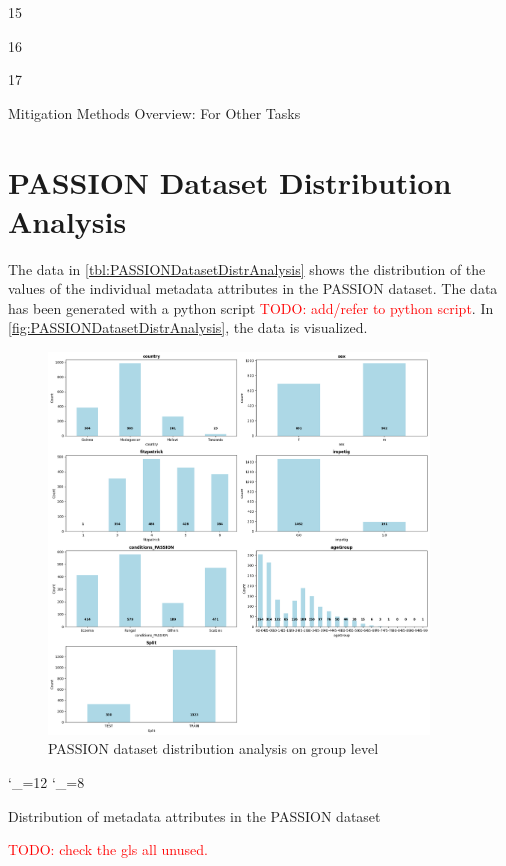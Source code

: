 \documentclass[12pt, a4paper, oneside]{book}   	%
\renewcommand{\todo}[1]{\textcolor{red}{TODO: #1}}
\begin{document}
\begin{appendices}
\begin{table}[H]
\begin{threeparttable}
\begin{tablenotes}
\begin{minipage}{0.33\textwidth}
							\item[15] \autocite{M5_}
							\item[16] \autocite{M90_}
							\item[17] \autocite{M65_}
						\end{minipage}%
					\end{tablenotes}
				\end{threeparttable}
				\caption{Mitigation Methods Overview: For Other  Tasks}
				\label{tab:mitigation_methods_others}
			\end{table}
			
			
			\chapter{PASSION Dataset Distribution Analysis}\label{app:PASSIONdataDistributionAnalysis}

			The data in \autoref{tbl:PASSIONDatasetDistrAnalysis} shows the distribution of the values of the individual metadata attributes in the PASSION dataset. The data has been generated with a python script \todo{add/refer to python script}. In \autoref{fig:PASSIONDatasetDistrAnalysis}, the data is visualized.
			\begin{figure}[H]
				\centering
				\includegraphics[width=0.9\textwidth]{figures/PASSION_split_all_distributions.png}
				\caption{PASSION dataset distribution analysis on group level}
				\label{fig:PASSIONDatasetDistrAnalysis}
			\end{figure}
			
			\begin{table}[H]
				\centering
				{
					\catcode`\_=12
					\catcode`\_=8
				}
				\caption{Distribution of metadata attributes in the PASSION dataset}
				\label{tbl:PASSIONDatasetDistrAnalysis}
			\end{table}
		\end{appendices}
		
		
		
			
		\glsaddallunused                                %
		\todo{check the gls all unused.}
		
	
\end{document}
